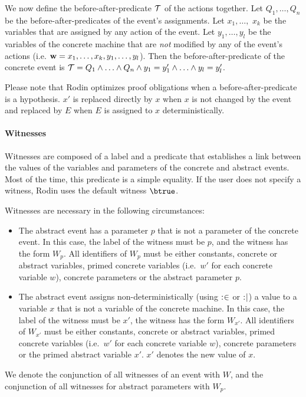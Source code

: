 We now define the before-after-predicate $\mathcal{T}$ of the actions together.
Let $Q_1,\ldots,Q_n$ be the before-after-predicates of the event's assignments. 
Let $x_1,\ldots,$ $x_k$ %
be the variables that are assigned by any action of the event.
Let $y_1,\ldots,y_l$ be the variables of the concrete machine that are \emph{not} modified by any of 
 the event's actions (i.e. $\mathbf{w} = x_1,\ldots,x_k,y_1,\ldots,y_l$).
Then the before-after-predicate of the concrete event is 
  $\mathcal{T} = Q_1 \land \ldots \land Q_n \land y_1 = y_1' \land \ldots \land y_l=y_l'$.

Please note that Rodin optimizes proof obligations when a before-after-predicate is a hypothesis.
$x'$ is replaced directly by $x$ when $x$ is not changed by the event and replaced by $E$
 when $E$ is assigned to $x$ deterministically.

\paragraph{Witnesses}
\label{witness}

Witnesses are composed of a label and a predicate that establishes a link between the values 
  of the variables and parameters of the concrete and abstract events.
Most of the time, this predicate is a simple equality.
If the user does not specify a witness, Rodin uses the default witness $\btrue$.

Witnesses are necessary in the following circumstances:
\begin{itemize}
\item The abstract event has a parameter $p$ that is not a parameter of the concrete  event.
  In this case, the label of the witness must be $p$, and the witness has the form  $W_p$.
  All identifiers of $W_p$ must be either constants, concrete or abstract variables,
  primed concrete variables (i.e.~$w'$ for each concrete variable $w$),
  concrete parameters or the abstract parameter $p$.
\item The abstract event assigns non-deterministically (using $\mathrel{:\mkern1mu\in}$ or $\mathrel{:\mkern1mu\mid}$) 
  a value to a variable $x$ that is not a variable of the concrete machine.
  In this case, the label of the witness must be $x'$, the witness has the form $W_{x'}$.
  All identifiers of $W_{x'}$ must be either constants, concrete or abstract variables,
  primed concrete variables (i.e.~$w'$ for each concrete variable $w$),
  concrete parameters or the primed abstract variable $x'$.
  $x'$ denotes the new value of $x$.
\end{itemize}
We denote the conjunction of all witnesses of an event with $W$, and the conjunction of all witnesses for abstract parameters with $W_p$.

